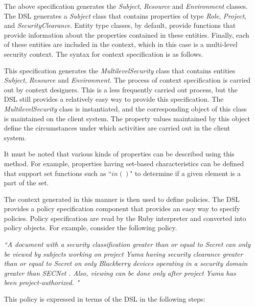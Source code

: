 

The above specification generates the {\em Subject}, {\em Resource} and {\em Environment} classes. The DSL generates a {\em Subject} class that contains properties of type {\em Role}, {\em Project}, and {\em SecurityClearance}. Entity type classes, by default, provide functions that provide information about the  properties contained in these entities. Finally, each of these entities are included in the context, which in this case is a multi-level security context. The syntax for context specification is as follows. 



This specification generates the {\em MultilevelSecurity} class that contains entities {\em Subject}, {\em Resource} and {\em Environment}. The process of context specification is carried out by context designers. This is a less frequently carried out process, but the DSL still provides a relatively easy way to provide this specification. The {\em MultilevelSecurity} class is instantiated, and the corresponding object of this class is maintained on the client system. The property values maintained by this object define the circumstances under which activities are carried out in the client system. 

It must be noted that various kinds of properties can be described using this method. For example, properties having set-based characteristics can be defined that support set functions such as ``$in()$" to determine if a given element is a part of the set. 

The context generated in this manner is then used to define policies. The DSL provides a policy specification component that provides an easy way to specify policies. Policy specification are read by the Ruby interpreter and converted into policy objects. For example, consider the following policy. 

{\em ``A document with a security classification greater than or equal to Secret can only be viewed by subjects working on project Yuma having security clearance greater than or equal to Secret on only Blackberry devices operating in a security domain greater than SECNet . Also, viewing can be done only after project Yuma has been project-authorized. "}

This policy is expressed in terms of the DSL in the following steps: 



